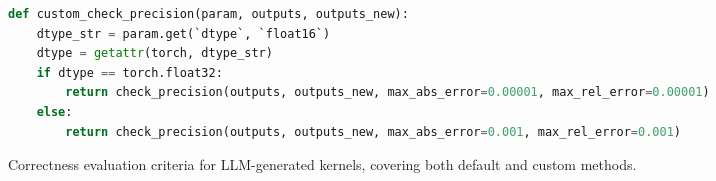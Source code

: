 \begin{table}[t]
\begin{tcolorbox}
\begin{tcolorbox}[
      sharp corners,
      colframe=refgreen,
      colback=refgreen!5,
      colbacktitle=refgreen!15,
      coltitle=refgreen,
      boxrule=0.4pt,
      title={\textbf{Custom evaluation criteria}},
      fonttitle=\bfseries\small,
      left=0pt,
      right=0pt,
      top=-4pt,
      bottom=-5pt
    ]
      \begin{center}
        \begin{lstlisting}[style=mystyle, frame=none,framerule=0pt, language=Python,upquote=true]
def custom_check_precision(param, outputs, outputs_new):
    dtype_str = param.get(`dtype`, `float16`)
    dtype = getattr(torch, dtype_str)
    if dtype == torch.float32:
        return check_precision(outputs, outputs_new, max_abs_error=0.00001, max_rel_error=0.00001)
    else:
        return check_precision(outputs, outputs_new, max_abs_error=0.001, max_rel_error=0.001)
\end{lstlisting}
\end{center}
\end{tcolorbox}
\end{tcolorbox}
\vspace{-10pt}
\caption{Correctness evaluation criteria for LLM-generated kernels, covering both default and custom methods.}
\label{tab:kernel_correctness}
\end{table}



